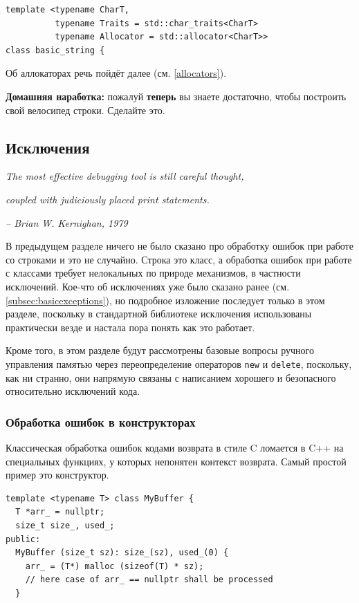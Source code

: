 \documentclass[a4paper,12pt,oneside]{article}
\begin{document}
\begin{lstlisting}
template <typename CharT,
          typename Traits = std::char_traits<CharT>
          typename Allocator = std::allocator<CharT>> 
class basic_string {
\end{lstlisting}

Об аллокаторах речь пойдёт далее (см. \ref{allocators}).

\textbf{Домашняя наработка:} пожалуй \textbf{теперь} вы знаете достаточно, чтобы построить свой велосипед строки. Сделайте это.

\pagebreak
\subsection{Исключения}\label{subsec:exceptions}

\hfill\textit{The most effective debugging tool is still careful thought,}

\hfill\textit{coupled with judiciously placed print statements.}{\vspace{0.5em}}

\hfill\textit{-- Brian W. Kernighan, 1979}

В предыдущем разделе ничего не было сказано про обработку ошибок при работе со строками и это не случайно. Строка это класс, а обработка ошибок при работе с классами требует нелокальных по природе механизмов, в частности исключений. Кое-что об исключениях уже было сказано ранее (см. \ref{subsec:basicexceptions}), но подробное изложение последует только в этом разделе, поскольку в стандартной библиотеке исключения использованы практически везде и настала пора понять как это работает.

Кроме того, в этом разделе будут рассмотрены базовые вопросы ручного управления памятью через переопределение операторов \lstinline!new! и \lstinline!delete!, поскольку, как ни странно, они напрямую связаны с написанием хорошего и безопасного относительно исключений кода.

\subsubsection{Обработка ошибок в конструкторах}\label{subsub:ctorerrs}

Классическая обработка ошибок кодами возврата в стиле C ломается в C++ на специальных функциях, у которых непонятен контекст возврата. Самый простой пример это конструктор.

\begin{lstlisting}
template <typename T> class MyBuffer {
  T *arr_ = nullptr;
  size_t size_, used_;
public:
  MyBuffer (size_t sz): size_(sz), used_(0) {
    arr_ = (T*) malloc (sizeof(T) * sz);
    // here case of arr_ == nullptr shall be processed
  }
\end{lstlisting}
\end{document}
